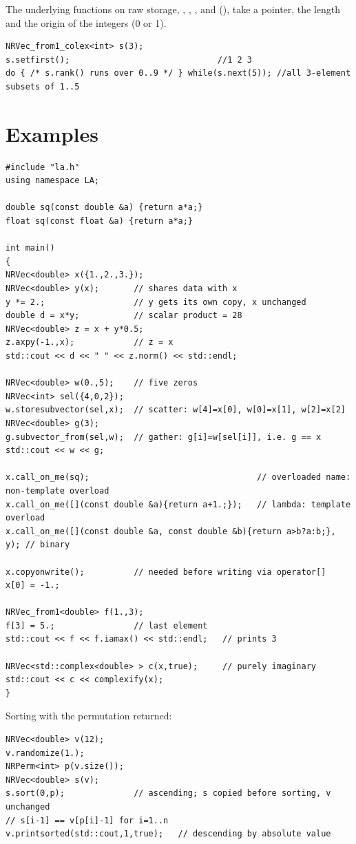 The underlying functions on raw storage, , , ,  and
 (), take a pointer, the length and the origin of the integers (0 or 1).

\begin{lstlisting}
NRVec_from1_colex<int> s(3);
s.setfirst();                              //1 2 3
do { /* s.rank() runs over 0..9 */ } while(s.next(5)); //all 3-element subsets of 1..5
\end{lstlisting}

\section{Examples}\label{sec:vec:examples}

\begin{lstlisting}
#include "la.h"
using namespace LA;

double sq(const double &a) {return a*a;}
float sq(const float &a) {return a*a;}

int main()
{
NRVec<double> x({1.,2.,3.});
NRVec<double> y(x);       // shares data with x
y *= 2.;                  // y gets its own copy, x unchanged
double d = x*y;           // scalar product = 28
NRVec<double> z = x + y*0.5;
z.axpy(-1.,x);            // z = x
std::cout << d << " " << z.norm() << std::endl;

NRVec<double> w(0.,5);    // five zeros
NRVec<int> sel({4,0,2});
w.storesubvector(sel,x);  // scatter: w[4]=x[0], w[0]=x[1], w[2]=x[2]
NRVec<double> g(3);
g.subvector_from(sel,w);  // gather: g[i]=w[sel[i]], i.e. g == x
std::cout << w << g;

x.call_on_me(sq);                                  // overloaded name: non-template overload
x.call_on_me([](const double &a){return a+1.;});   // lambda: template overload
x.call_on_me([](const double &a, const double &b){return a>b?a:b;}, y); // binary

x.copyonwrite();          // needed before writing via operator[]
x[0] = -1.;

NRVec_from1<double> f(1.,3);
f[3] = 5.;                // last element
std::cout << f << f.iamax() << std::endl;   // prints 3

NRVec<std::complex<double> > c(x,true);     // purely imaginary
std::cout << c << complexify(x);
}
\end{lstlisting}

Sorting with the permutation returned:
\begin{lstlisting}
NRVec<double> v(12);
v.randomize(1.);
NRPerm<int> p(v.size());
NRVec<double> s(v);
s.sort(0,p);              // ascending; s copied before sorting, v unchanged
// s[i-1] == v[p[i]-1] for i=1..n
v.printsorted(std::cout,1,true);   // descending by absolute value
\end{lstlisting}

